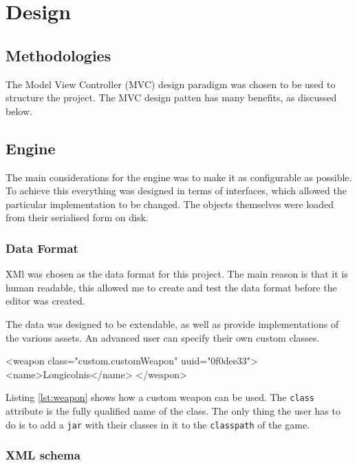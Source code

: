 \section{Design}

\subsection{Methodologies}
\label{sub:methodologies}
The Model View Controller (MVC) design paradigm was chosen to be used to structure the project. The MVC design patten has many benefits, as discussed below.  


\subsection{Engine}
The main considerations  for the engine was to make it as configurable as possible. To achieve this everything was designed in terms of interfaces, which allowed the particular implementation to be changed. The objects themselves were loaded from their serialised form on disk. 

\subsubsection{Data Format}
\label{ssub:data_format}
XMl was chosen as the data format for this project. The main reason is that it is human readable, this allowed me to create and test the data format before the editor was created.

The data was designed to be extendable, as well as provide implementations of the various assets. An advanced user can specify their own custom classes.

\begin{lst:weapon}[caption=Example of Custom weapon, label=lst:weapon]
<weapon class="custom.customWeapon" uuid="0f0dee33">
	<name>Longicolnis</name>
</weapon>
\end{lst:weapon}

Listing \ref{lst:weapon} shows how a custom weapon can be used. The \texttt{class} attribute is  the fully qualified name of the class. The only thing the user has to do is to add a \texttt{jar} with their classes in it to the \texttt{classpath} of the game. 

\subsubsection{XML schema}

